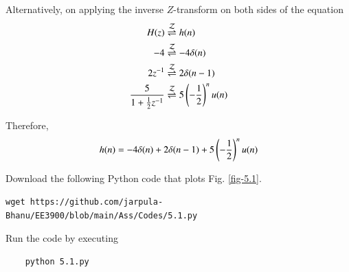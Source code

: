 \documentclass[journal,12pt,twocolumn]{IEEEtran}
\renewcommand\thesection{\arabic{section}}
\begin{document}
\begin{enumerate}[label=\thesection.\arabic*
,ref=\thesection.\theenumi]
Alternatively, on applying the inverse $Z$-transform on both sides of the equation
\begin{align}
	H(z) &\overset{\mathcal{Z}}{ \rightleftharpoons} h(n) \\
	-4 &\overset{\mathcal{Z}}{ \rightleftharpoons} -4\delta(n) \\
	2z^{-1} &\overset{\mathcal{Z}}{ \rightleftharpoons} 2\delta(n - 1) \\
	\frac{5}{1 + \frac12 z^{-1}} &\overset{\mathcal{Z}}{ \rightleftharpoons} 5\left(-\frac12\right)^n u(n) \\
\end{align}

Therefore,
\begin{equation}
	h(n) = -4\delta(n) + 2\delta(n - 1) + 5\left(-\frac12\right)^n u(n)
\end{equation}

Download the following Python code that plots Fig. \ref{fig-5.1}.
\begin{lstlisting}
wget https://github.com/jarpula-Bhanu/EE3900/blob/main/Ass/Codes/5.1.py
\end{lstlisting}

Run the code by executing
\begin{lstlisting}
	python 5.1.py
\end{lstlisting}


\end{enumerate}
\end{document}
